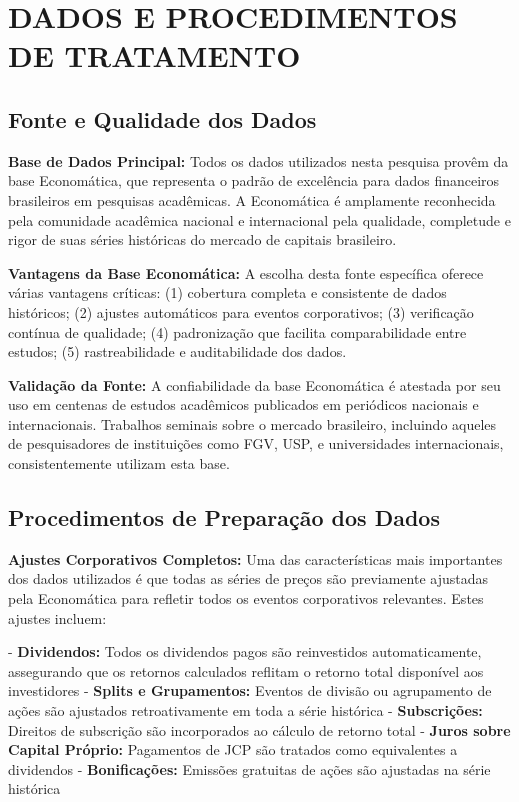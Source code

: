 \section{DADOS E PROCEDIMENTOS DE TRATAMENTO}

\subsection{Fonte e Qualidade dos Dados}

\textbf{Base de Dados Principal:} Todos os dados utilizados nesta pesquisa provêm da base Economática, que representa o padrão de excelência para dados financeiros brasileiros em pesquisas acadêmicas. A Economática é amplamente reconhecida pela comunidade acadêmica nacional e internacional pela qualidade, completude e rigor de suas séries históricas do mercado de capitais brasileiro.

\textbf{Vantagens da Base Economática:} A escolha desta fonte específica oferece várias vantagens críticas: (1) cobertura completa e consistente de dados históricos; (2) ajustes automáticos para eventos corporativos; (3) verificação contínua de qualidade; (4) padronização que facilita comparabilidade entre estudos; (5) rastreabilidade e auditabilidade dos dados.

\textbf{Validação da Fonte:} A confiabilidade da base Economática é atestada por seu uso em centenas de estudos acadêmicos publicados em periódicos nacionais e internacionais. Trabalhos seminais sobre o mercado brasileiro, incluindo aqueles de pesquisadores de instituições como FGV, USP, e universidades internacionais, consistentemente utilizam esta base.

\subsection{Procedimentos de Preparação dos Dados}

\textbf{Ajustes Corporativos Completos:} Uma das características mais importantes dos dados utilizados é que todas as séries de preços são previamente ajustadas pela Economática para refletir todos os eventos corporativos relevantes. Estes ajustes incluem:

- \textbf{Dividendos:} Todos os dividendos pagos são reinvestidos automaticamente, assegurando que os retornos calculados reflitam o retorno total disponível aos investidores
- \textbf{Splits e Grupamentos:} Eventos de divisão ou agrupamento de ações são ajustados retroativamente em toda a série histórica
- \textbf{Subscrições:} Direitos de subscrição são incorporados ao cálculo de retorno total
- \textbf{Juros sobre Capital Próprio:} Pagamentos de JCP são tratados como equivalentes a dividendos
- \textbf{Bonificações:} Emissões gratuitas de ações são ajustadas na série histórica

